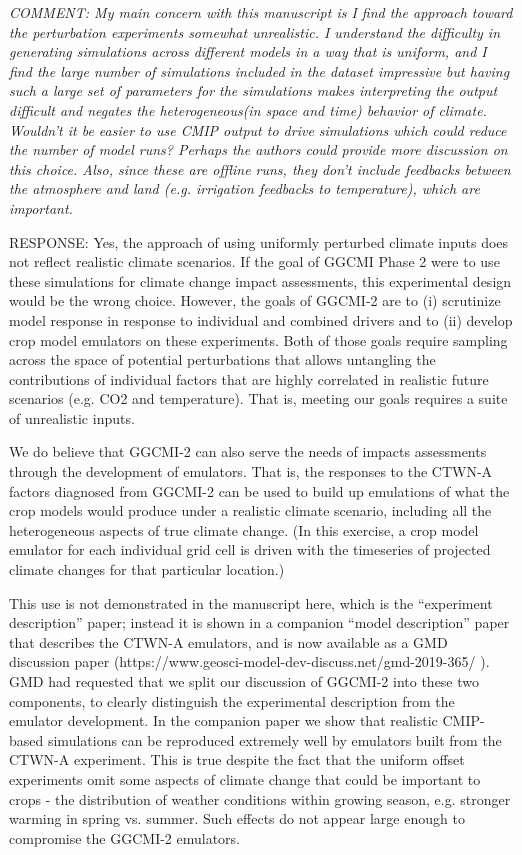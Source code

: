 \documentclass[gmd, manuscript]{copernicus} %
\begin{document}
\textcolor{dark-gray}{\textit{COMMENT: My main concern with this manuscript is I find the approach toward the perturbation experiments somewhat unrealistic. I understand the difficulty in generating simulations across different models in a way that is uniform, and I find the large number of simulations included in the dataset impressive but having such a large set of parameters for the simulations makes interpreting the output difficult and negates the heterogeneous(in space and time) behavior of climate. Wouldn’t it be easier to use CMIP output to drive simulations which could reduce the number of model runs? Perhaps the authors could provide more discussion on this choice. Also, since these are offline runs, they don’t include feedbacks between the atmosphere and land (e.g. irrigation feedbacks to temperature), which are important.}}

RESPONSE: Yes, the approach of using uniformly perturbed climate inputs does not reflect realistic climate scenarios. If the goal of GGCMI Phase 2 were to use these simulations for climate change impact assessments, this experimental design would be the wrong choice. However, the goals of GGCMI-2 are to (i) scrutinize model response in response to individual and combined drivers and to (ii) develop crop model emulators on these experiments. Both of those goals require sampling across the space of potential perturbations that allows untangling the contributions of individual factors that are highly correlated in realistic future scenarios (e.g. CO2 and temperature). That is, meeting our goals requires a suite of unrealistic inputs.

We do believe that GGCMI-2 can also serve the needs of impacts assessments through the development of emulators. That is, the responses to the CTWN-A factors diagnosed from GGCMI-2 can be used to build up emulations of what the crop models would produce under a realistic climate scenario, including all the heterogeneous aspects of true climate change. (In this exercise, a crop model emulator for each individual grid cell is driven with the timeseries of projected climate changes for that particular location.) 

This use is not demonstrated in the manuscript here, which is the “experiment description” paper; instead it is shown in a companion “model description” paper that describes the CTWN-A emulators, and is now available as a GMD discussion paper (https://www.geosci-model-dev-discuss.net/gmd-2019-365/ ). GMD had requested that we split our discussion of GGCMI-2 into these two components, to clearly distinguish the experimental description from the emulator development. In the companion paper we show that realistic CMIP-based simulations can be reproduced extremely well by emulators built from the CTWN-A experiment. This is true despite the fact that the uniform offset experiments omit some aspects of climate change that could be important to crops - the distribution of weather conditions within growing season, e.g. stronger warming in spring vs. summer.  Such effects do not appear large enough to compromise the GGCMI-2 emulators. 
\end{document}
